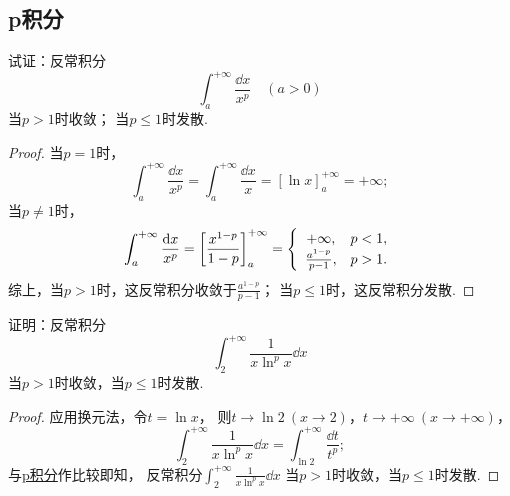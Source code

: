 \subsection{p积分}
\begin{example}[p积分]\label{example:定积分.p积分}
试证：反常积分\[
\int_a^{+\infty} \frac{\dd{x}}{x^p} \quad(a>0)
\]
当\(p > 1\)时收敛；
当\(p \leq 1\)时发散.
\begin{proof}
当\(p=1\)时，\[
\int_a^{+\infty} \frac{\dd{x}}{x^p}
= \int_a^{+\infty} \frac{\dd{x}}{x}
= [\ln x]_a^{+\infty} = +\infty;
\]当\(p\neq1\)时，\[
\int_a^{+\infty} \frac{\dd{x}}{x^p}
= \left[ \frac{x^{1-p}}{1-p} \right]_a^{+\infty}
= \left\{ \def\arraystretch{1.2} \begin{array}{cl}
+\infty, & p<1, \\
\frac{a^{1-p}}{p-1}, & p>1.
\end{array} \right.
\]
综上，当\(p > 1\)时，这反常积分收敛于\(\frac{a^{1-p}}{p-1}\)；
当\(p\leq1\)时，这反常积分发散.
\end{proof}
\end{example}

\begin{example}
证明：反常积分\[
\int_2^{+\infty} \frac{1}{x \ln^p x} \dd{x}
\]
当\(p>1\)时收敛，当\(p\leq1\)时发散.
\begin{proof}
应用换元法，令\(t = \ln x\)，%
则\(t \to \ln2\ (x\to2)\)，\(t \to +\infty\ (x\to+\infty)\)，%
\[
\int_2^{+\infty} \frac{1}{x \ln^p x} \dd{x}
= \int_{\ln2}^{+\infty} \frac{\dd{t}}{t^p};
\]
与\hyperref[example:定积分.p积分]{p积分}作比较即知，
反常积分\(\int_2^{+\infty} \frac{1}{x \ln^p x} \dd{x}\)%
当\(p>1\)时收敛，当\(p\leq1\)时发散.
\end{proof}
\end{example}

